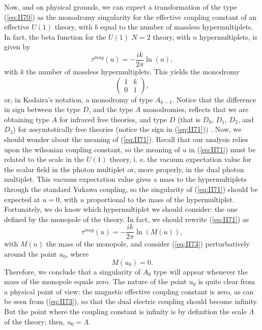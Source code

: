Now, and on physical grounds, we can expect a transformation of the type (\ref{eq:II70}) 
as the monodromy singularity for the effective coupling constant of an effective 
$U(1)$ theory, with $b$ equal to the number of massless hypermultiplets. In fact, 
the beta function for the $U(1)$ $N\!=\!2$ theory, with $n$ hypermultiplets, 
is given by
\begin{equation}
\tau^{mag} (u) = - \frac {ik}{2\pi} \ln (u),
\label{eq:II71}
\end{equation}
with $k$ the number of massless hypermultiplets. This yields the 
monodromy 
\begin{equation}
	\left( \begin{array}{cc} 1 & k  \\
			 0 & 1 
	\end{array} \right),
\label{eq:II72}
\end{equation}
or, in Kodaira's notation, a monodromy of type $A_{k-1}$. Notice
that the difference in sign between the type $D$, and the type
$A$ monodromies, reflects that we are obtaining type $A$ for
infrared free theories, and type $D$ (that is $D_0$, $D_1$,
$D_2$, and $D_3$) for assymtotically free theories (notice the
sign in (\ref{eq:II71})) \cite{GMS}. Now, we should wonder about the meaning
of (\ref{eq:II71}). Recall that our analysis relies upon the
wilsonian coupling constant, so the meaning of $u$ in
(\ref{eq:II71}) must be related to the scale in the $U(1)$
theory, i. e. the vacuum expectation value for the scalar field
in the photon multiplet or, more properly, in the dual photon
multiplet. This vacuum expectation value gives a mass to the
hypermultiplets through the standard Yukawa coupling, so the
singularity of (\ref{eq:II71}) should be expected at $u=0$, with $u$
proportional to the mass of the hypermultiplet. Fortunately, we
do know which hypermultiplet we should consider: the one
defined by the monopole of the theory. In fact, we should
rewrite (\ref{eq:II71}) as
\begin{equation}
\tau^{mag}(u) = - \frac {ik}{2\pi} \ln (M(u)),
\label{eq:II73}
\end{equation}
with $M(u)$ the mass of the monopole, and consider (\ref{eq:II73})
perturbatively around the point $u_0$, where 
\begin{equation}
M(u_0)=0.
\label{eq:II74}
\end{equation}
Therefore, we conclude that a singularity of $A_0$ type will appear whenever
the mass of the monopole equals zero. The nature of the point $u_0$ 
is quite clear from a
physical point of view: the magnetic effective coupling constant
is zero, as can be seen from (\ref{eq:II73}), so that the dual
electric coupling should become infinity. But the point where the
coupling constant is infinity is by definition the
scale $\Lambda$ of the theory; then, $u_0=\Lambda$. 
  
